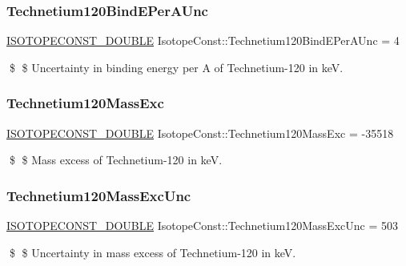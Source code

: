 \subsubsection{\texorpdfstring{Technetium120\+Bind\+E\+Per\+A\+Unc}{Technetium120BindEPerAUnc}}
{\footnotesize\ttfamily \mbox{\hyperlink{group___isotope_const-_macros_ga8f45a7272ce02c0b4c65c44636ed719a}{I\+S\+O\+T\+O\+P\+E\+C\+O\+N\+S\+T\+\_\+\+D\+O\+U\+B\+LE}} Isotope\+Const\+::\+Technetium120\+Bind\+E\+Per\+A\+Unc = 4}

\$ \$ Uncertainty in binding energy per A of Technetium-\/120 in keV. \mbox{\label{group___isotope_const-_technetium-_tc120_gad97594bcfdadf3556eb5f9f37eb780aa}} 
\subsubsection{\texorpdfstring{Technetium120\+Mass\+Exc}{Technetium120MassExc}}
{\footnotesize\ttfamily \mbox{\hyperlink{group___isotope_const-_macros_ga8f45a7272ce02c0b4c65c44636ed719a}{I\+S\+O\+T\+O\+P\+E\+C\+O\+N\+S\+T\+\_\+\+D\+O\+U\+B\+LE}} Isotope\+Const\+::\+Technetium120\+Mass\+Exc = -\/35518}

\$ \$ Mass excess of Technetium-\/120 in keV. \mbox{\label{group___isotope_const-_technetium-_tc120_ga73d0cb0a931d33199b49cc8579d5ccd6}} 
\subsubsection{\texorpdfstring{Technetium120\+Mass\+Exc\+Unc}{Technetium120MassExcUnc}}
{\footnotesize\ttfamily \mbox{\hyperlink{group___isotope_const-_macros_ga8f45a7272ce02c0b4c65c44636ed719a}{I\+S\+O\+T\+O\+P\+E\+C\+O\+N\+S\+T\+\_\+\+D\+O\+U\+B\+LE}} Isotope\+Const\+::\+Technetium120\+Mass\+Exc\+Unc = 503}

\$ \$ Uncertainty in mass excess of Technetium-\/120 in keV. \mbox{\label{group___isotope_const-_technetium-_tc120_ga401dced2ef36db4aee362268192798e5}} 
